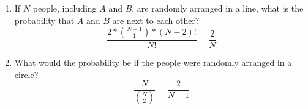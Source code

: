 \item 
\begin{enumerate}
    \item If $N$ people, including $A$ and $B$, are randomly arranged in a line, what is the probability that $A$ and $B$ are next to each other?
    \[ \frac{2 * \binom{N-1}{1} * (N-2)!}{N!} = \frac{2}{N} \]
    \item What would the probability be if the people were randomly arranged in a circle?
    \[ \frac{N}{\binom{N}{2}} = \frac{2}{N-1} \]
\end{enumerate}